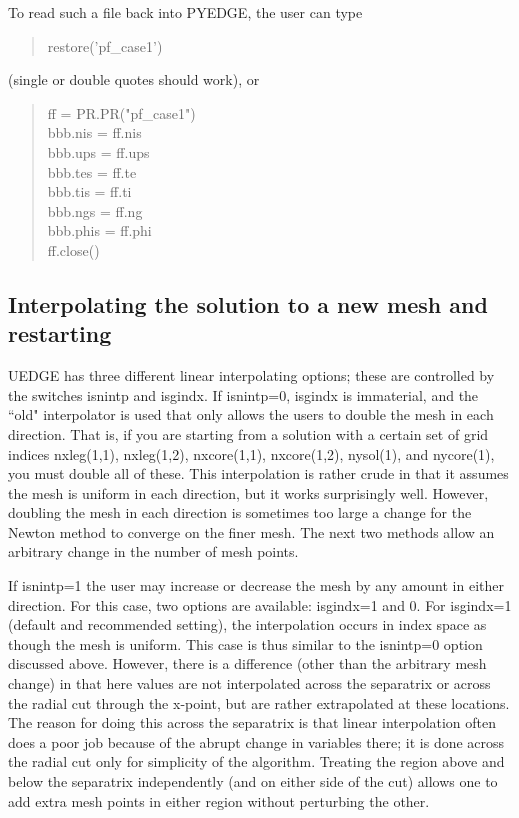 \documentclass [12pt]{article}
\begin{document}
To read such a file back into {\sf PYEDGE}, the user can type
  \begin{verse} \sf
    restore('pf\_case1')
  \end{verse}
  
  \noindent  (single or double quotes should work), or
  
  \begin{verse} \sf
     ff = PR.PR("pf\_case1") \\
     bbb.nis = ff.nis \\
     bbb.ups = ff.ups \\
     bbb.tes = ff.te \\
     bbb.tis = ff.ti \\
     bbb.ngs = ff.ng \\
     bbb.phis = ff.phi \\
     ff.close()
  \end{verse}
  
\subsection{Interpolating the solution to a new mesh and restarting}
\label{interpsec}

{\sf UEDGE} has three different linear interpolating options; these are
controlled by the switches {\sf isnintp} and {\sf isgindx}. If {\sf
  isnintp=0}, {\sf isgindx} is immaterial, and the ``old" interpolator is used
that only allows the users to double the mesh in each direction. That is, if
you are starting from a solution with a certain set of grid indices {\sf
  nxleg(1,1), nxleg(1,2), nxcore(1,1), nxcore(1,2), nysol(1),} and {\sf
  nycore(1)}, you must double all of these. This interpolation is rather crude
in that it assumes the mesh is uniform in each direction, but it works
surprisingly well. However, doubling the mesh in each direction is sometimes
too large a change for the Newton method to converge on the finer mesh. The
next two methods allow an arbitrary change in the number of mesh points.

If {\sf isnintp}=1 the user may increase or decrease the mesh by any amount in
either direction. For this case, two options are available: {\sf isgindx}=1
and 0.  For {\sf isgindx}=1 (default and recommended setting), the
interpolation occurs in index space as though the mesh is uniform. This case
is thus similar to the {\sf isnintp}=0 option discussed above.  However, there
is a difference (other than the arbitrary mesh change) in that here values are
not interpolated across the separatrix or across the radial cut through the
x-point, but are rather extrapolated at these locations. The reason for doing
this across the separatrix is that linear interpolation often does a poor job
because of the abrupt change in variables there; it is done across the radial
cut only for simplicity of the algorithm. Treating the region above and below
the separatrix independently (and on either side of the cut) allows one to add
extra mesh points in either region without perturbing the other.
\end{document}
